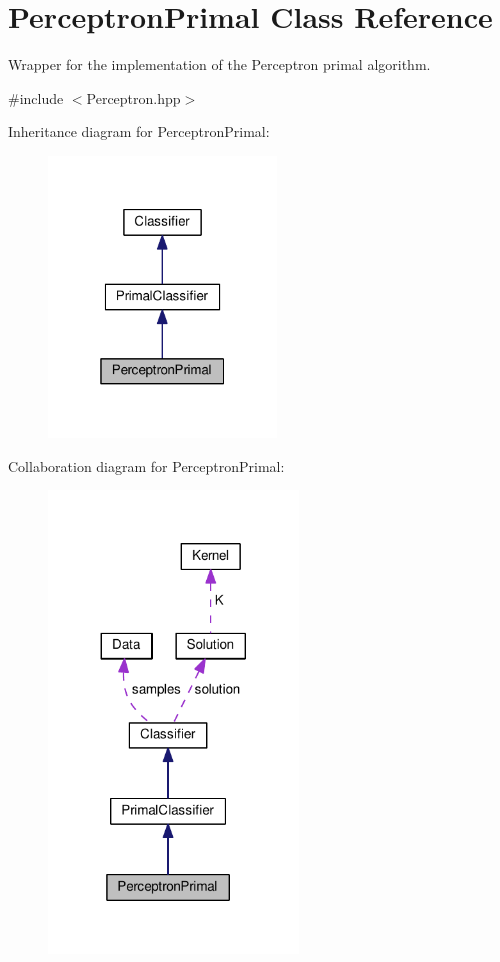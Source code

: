 \hypertarget{class_perceptron_primal}{}\section{Perceptron\+Primal Class Reference}
\label{class_perceptron_primal}


Wrapper for the implementation of the Perceptron primal algorithm.  




{\ttfamily \#include $<$Perceptron.\+hpp$>$}



Inheritance diagram for Perceptron\+Primal\+:\nopagebreak
\begin{figure}[H]
\begin{center}
\leavevmode
\includegraphics[width=172pt]{class_perceptron_primal__inherit__graph}
\end{center}
\end{figure}


Collaboration diagram for Perceptron\+Primal\+:\nopagebreak
\begin{figure}[H]
\begin{center}
\leavevmode
\includegraphics[width=188pt]{class_perceptron_primal__coll__graph}
\end{center}
\end{figure}

